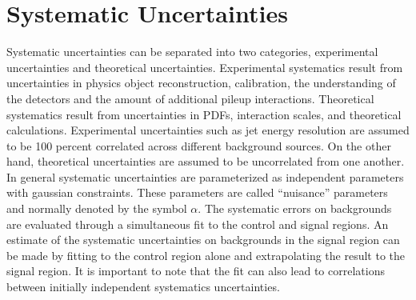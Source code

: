 
\chapter{Systematic Uncertainties}
\label{chap:Uncertainties}

\indent Systematic uncertainties can be separated into two categories, experimental uncertainties and theoretical uncertainties.  Experimental systematics result from uncertainties in physics object reconstruction, calibration, the understanding of the detectors and the amount of additional pileup interactions.  Theoretical systematics result from uncertainties in PDFs, interaction scales, and theoretical calculations. Experimental uncertainties such as jet energy resolution are assumed to be 100 percent correlated across different background sources.  On the other hand, theoretical uncertainties are assumed to be uncorrelated from one another.  \\

\indent In general systematic uncertainties are parameterized as independent parameters with gaussian constraints.  These parameters are called ``nuisance'' parameters and normally denoted by the symbol $\alpha$.  The systematic errors on backgrounds are evaluated through a simultaneous fit to the control and signal regions.  An estimate of the systematic uncertainties on backgrounds in the signal region can be made by fitting to the control region alone and extrapolating the result to the signal region.  It is important to note that the fit can also lead to correlations between initially independent systematics uncertainties. \\



